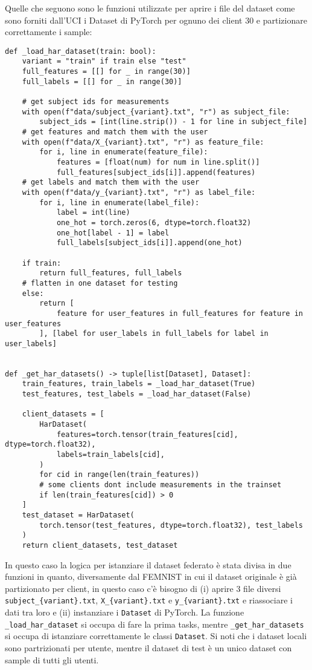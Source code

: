 Quelle che seguono sono le funzioni utilizzate per aprire i file del 
dataset come sono forniti dall'UCI i Dataset di PyTorch per 
ognuno dei client 30 e partizionare correttamente i sample:
\clearpage
\begin{lstlisting}
def _load_har_dataset(train: bool):
    variant = "train" if train else "test"
    full_features = [[] for _ in range(30)]
    full_labels = [[] for _ in range(30)]

    # get subject ids for measurements
    with open(f"data/subject_{variant}.txt", "r") as subject_file:
        subject_ids = [int(line.strip()) - 1 for line in subject_file]
    # get features and match them with the user
    with open(f"data/X_{variant}.txt", "r") as feature_file:
        for i, line in enumerate(feature_file):
            features = [float(num) for num in line.split()]
            full_features[subject_ids[i]].append(features)
    # get labels and match them with the user
    with open(f"data/y_{variant}.txt", "r") as label_file:
        for i, line in enumerate(label_file):
            label = int(line)
            one_hot = torch.zeros(6, dtype=torch.float32)
            one_hot[label - 1] = label
            full_labels[subject_ids[i]].append(one_hot)

    if train:
        return full_features, full_labels
    # flatten in one dataset for testing
    else:
        return [
            feature for user_features in full_features for feature in user_features
        ], [label for user_labels in full_labels for label in user_labels]


def _get_har_datasets() -> tuple[list[Dataset], Dataset]:
    train_features, train_labels = _load_har_dataset(True)
    test_features, test_labels = _load_har_dataset(False)

    client_datasets = [
        HarDataset(
            features=torch.tensor(train_features[cid], dtype=torch.float32),
            labels=train_labels[cid],
        )
        for cid in range(len(train_features))
        # some clients dont include measurements in the trainset
        if len(train_features[cid]) > 0
    ]
    test_dataset = HarDataset(
        torch.tensor(test_features, dtype=torch.float32), test_labels
    )
    return client_datasets, test_dataset
\end{lstlisting}

In questo caso la logica per istanziare il dataset federato è stata 
divisa in due funzioni in quanto, diversamente dal FEMNIST in cui il 
dataset originale è già partizionato per client, in questo caso c'è 
bisogno di (i) aprire 3 file diversi \texttt{subject\_\{variant\}.txt}, 
\texttt{X\_\{variant\}.txt} e \texttt{y\_\{variant\}.txt} e riassociare 
i dati tra loro e (ii) instanziare i \texttt{Dataset} di PyTorch.
La funzione \texttt{\_load\_har\_dataset} si occupa di fare la prima tasks,
mentre \texttt{\_get\_har\_datasets} si occupa di istanziare correttamente le classi 
\texttt{Dataset}. Si noti che i dataset locali sono partrizionati per 
utente, mentre il dataset di test è un unico dataset con sample di 
tutti gli utenti.


